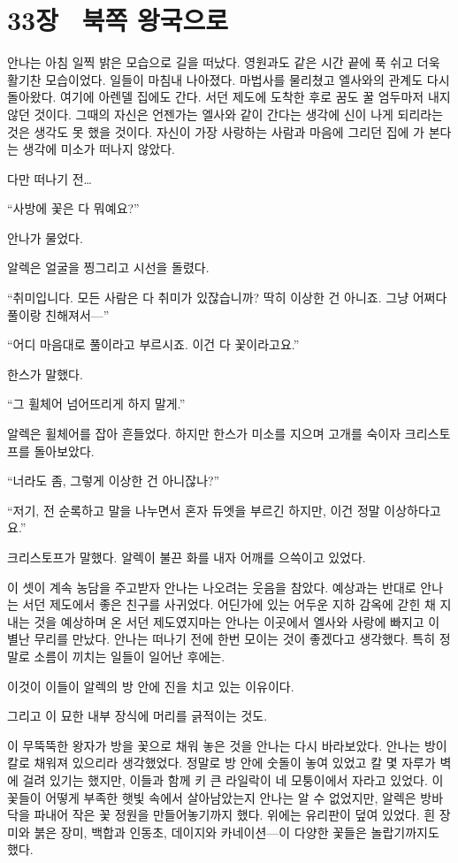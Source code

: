 

\chapter[33장  북쪽 왕국으로][33장\hspace*{.5em}북쪽 왕국으로]{33장 \ 북쪽 왕국으로}



안나는 아침 일찍 밝은 모습으로 길을 떠났다. 영원과도 같은 시간 끝에 푹 쉬고 더욱 활기찬 모습이었다. 일들이 마침내 나아졌다. 마법사를 물리쳤고 엘사와의 관계도 다시 돌아왔다. 여기에 아렌델 집에도 간다. 서던 제도에 도착한 후로 꿈도 꿀 엄두마저 내지 않던 것이다. 그때의 자신은 언젠가는 엘사와 같이 간다는 생각에 신이 나게 되리라는 것은 생각도 못 했을 것이다. 자신이 가장 사랑하는 사람과 마음에 그리던 집에 가 본다는 생각에 미소가 떠나지 않았다.

다만 떠나기 전\ldots

``사방에 꽃은 다 뭐예요?''

안나가 물었다.

알렉은 얼굴을 찡그리고 시선을 돌렸다.

``취미입니다. 모든 사람은 다 취미가 있잖습니까? 딱히 이상한 건 아니죠. 그냥 어쩌다 풀이랑 친해져서—''

``어디 마음대로 풀이라고 부르시죠. 이건 다 꽃이라고요.''

한스가 말했다.

``그 휠체어 넘어뜨리게 하지 말게.''

알렉은 휠체어를 잡아 흔들었다. 하지만 한스가 미소를 지으며 고개를 숙이자 크리스토프를 돌아보았다.

``너라도 좀, 그렇게 이상한 건 아니잖나?''

``저기, 전 순록하고 말을 나누면서 혼자 듀엣을 부르긴 하지만, 이건 정말 이상하다고요.''

크리스토프가 말했다. 알렉이 불끈 화를 내자 어깨를 으쓱이고 있었다.

이 셋이 계속 농담을 주고받자 안나는 나오려는 웃음을 참았다. 예상과는 반대로 안나는 서던 제도에서 좋은 친구를 사귀었다. 어딘가에 있는 어두운 지하 감옥에 갇힌 채 지내는 것을 예상하며 온 서던 제도였지마는 안나는 이곳에서 엘사와 사랑에 빠지고 이 별난 무리를 만났다. 안나는 떠나기 전에 한번 모이는 것이 좋겠다고 생각했다. 특히 정말로 소름이 끼치는 일들이 일어난 후에는.

이것이 이들이 알렉의 방 안에 진을 치고 있는 이유이다.

그리고 이 묘한 내부 장식에 머리를 긁적이는 것도.

이 무뚝뚝한 왕자가 방을 꽃으로 채워 놓은 것을 안나는 다시 바라보았다. 안나는 방이 칼로 채워져 있으리라 생각했었다. 정말로 방 안에 숫돌이 놓여 있었고 칼 몇 자루가 벽에 걸려 있기는 했지만, 이들과 함께 키 큰 라일락이 네 모퉁이에서 자라고 있었다. 이 꽃들이 어떻게 부족한 햇빛 속에서 살아남았는지 안나는 알 수 없었지만, 알렉은 방바닥을 파내어 작은 꽃 정원을 만들어놓기까지 했다. 위에는 유리판이 덮여 있었다. 흰 장미와 붉은 장미, 백합과 인동초, 데이지와 카네이션—이 다양한 꽃들은 놀랍기까지도 했다.

